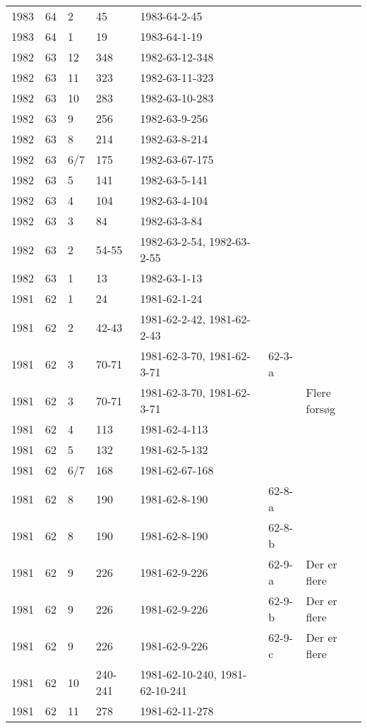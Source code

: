 \begin{longtable}{ |l|l|l|l|p{2.7cm}|l|p{2cm}| }
 1983 & 64 &     2 &    45   & 1983-64-2-45   &  & \\
 1983 & 64 &     1 &    19   & 1983-64-1-19   &  & \\
 1982 & 63 &    12 &   348   & 1982-63-12-348 &  & \\
 1982 & 63 &    11 &   323   & 1982-63-11-323 &  & \\
 1982 & 63 &    10 &   283   & 1982-63-10-283 &  & \\
 1982 & 63 &     9 &   256   & 1982-63-9-256  &  & \\
 1982 & 63 &     8 &   214   & 1982-63-8-214  &  & \\
 1982 & 63 &   6/7 &   175   & 1982-63-67-175 &  & \\
 1982 & 63 &     5 &   141   & 1982-63-5-141  &  & \\
 1982 & 63 &     4 &   104   & 1982-63-4-104  &  & \\
 1982 & 63 &     3 &   84    & 1982-63-3-84   &  & \\
 1982 & 63 &     2 &  54-55  & 1982-63-2-54, 1982-63-2-55  &  & \\
 1982 & 63 &     1 &   13    & 1982-63-1-13   &  & \\
 1981 & 62 &     1 &      24 &   1981-62-1-24 &  & \\
 1981 & 62 &     2 &   42-43 & 1981-62-2-42, 1981-62-2-43 &  & \\
 1981 & 62 &     3 &   70-71 & 1981-62-3-70, 1981-62-3-71 & 62-3-a & \\
 1981 & 62 &   3 &   70-71 & 1981-62-3-70, 1981-62-3-71 &  & Flere forsøg \\
 1981 & 62 &     4 &     113 &  1981-62-4-113 &  & \\
 1981 & 62 &     5 &     132 &  1981-62-5-132 &  & \\
 1981 & 62 &   6/7 &     168 & 1981-62-67-168 &  & \\
 1981 & 62 &     8 &     190 &  1981-62-8-190 & 62-8-a & \\
 1981 & 62 &     8 &     190 &  1981-62-8-190 & 62-8-b & \\
 1981 & 62 &     9 &     226 &  1981-62-9-226 &  62-9-a & Der er flere \\
 1981 & 62 &     9 &     226 &  1981-62-9-226 &  62-9-b & Der er flere \\
 1981 & 62 &     9 &     226 &  1981-62-9-226 &  62-9-c & Der er flere \\
 1981 & 62 &    10 & 240-241 & 1981-62-10-240, 1981-62-10-241 &  & \\
 1981 & 62 &    11 &     278 & 1981-62-11-278 &  & \\

\end{longtable}
